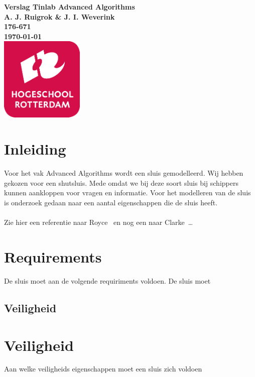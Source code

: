 \documentclass{article}
\begin{document}
\sffamily
\begin{titlepage}
  \centering
    \vfill
    {\bfseries\Huge
      Verslag Tinlab Advanced Algorithms \\
        \vskip2cm
      }
      {\bfseries\Large
        A. J. Ruigrok \& J. I. Weverink\\
      }
      {
        \bfseries\normalsize
        176-671\\
        \vskip1cm
        \today\\
    }
    \vfill
    \includegraphics[width=4cm]{logohr.png} %
    \vfill
    \vfill
\end{titlepage}
\newpage
\tableofcontents

\newpage
\section{Inleiding}
Voor het vak Advanced Algorithms wordt een sluis gemodelleerd. Wij hebben gekozen voor een shutsluis. Mede omdat we bij deze soort sluis bij schippers kunnen aankloppen voor vragen en informatie. Voor het modelleren van de sluis is onderzoek gedaan naar een aantal eigenschappen die de sluis heeft.
\\\\
Zie hier een referentie naar Royce~\cite{royce1987managing} en nog een naar Clarke~\cite{modelchecking}\ldots 


\section{Requirements}
De sluis moet aan de volgende requiriments voldoen.
De sluis moet 

\subsection{Veiligheid}
\section{Veiligheid}
Aan welke veiligheids eigenschappen moet een sluis zich voldoen
\end{document}
